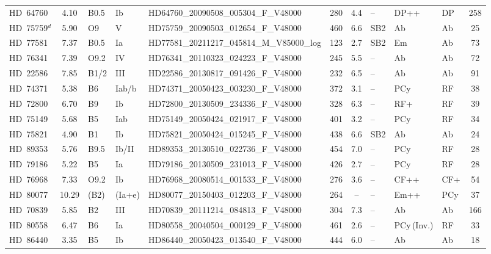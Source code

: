 {\begin{landscape}
\begin{longtable}{lclllcclllc}
\noalign{\smallskip}
HD~64760 & 4.10 & B0.5 & Ib & HD64760\_20090508\_005304\_F\_V48000 & 280 & 4.4 & -- & DP++ & DP & 258 \\
\noalign{\smallskip}
HD~75759$^{d}$ & 5.90 & O9 & V & HD75759\_20090503\_012654\_F\_V48000 & 460 & 6.6 & SB2 & Ab & Ab & 25 \\
\noalign{\smallskip}
HD~77581 & 7.37 & B0.5 & Ia & HD77581\_20211217\_045814\_M\_V85000\_log & 123 & 2.7 & SB2 & Em & Ab & 73 \\
\noalign{\smallskip}
HD~76341 & 7.39 & O9.2 & IV & HD76341\_20110323\_024223\_F\_V48000 & 245 & 5.5 & -- & Ab & Ab & 72 \\
\noalign{\smallskip}
HD~22586 & 7.85 & B1/2 & III & HD22586\_20130817\_091426\_F\_V48000 & 232 & 6.5 & -- & Ab & Ab & 91 \\
\noalign{\smallskip}
HD~74371 & 5.38 & B6 & Iab/b & HD74371\_20050423\_003230\_F\_V48000 & 372 & 3.1 & -- & PCy & RF & 38 \\
\noalign{\smallskip}
HD~72800 & 6.70 & B9 & Ib & HD72800\_20130509\_234336\_F\_V48000 & 328 & 6.3 & -- & RF+ & RF & 39 \\
\noalign{\smallskip}
HD~75149 & 5.68 & B5 & Iab & HD75149\_20050424\_021917\_F\_V48000 & 401 & 3.2 & -- & PCy & RF & 34 \\
\noalign{\smallskip}
HD~75821 & 4.90 & B1 & Ib & HD75821\_20050424\_015245\_F\_V48000 & 438 & 6.6 & SB2 & Ab & Ab & 24 \\
\noalign{\smallskip}
HD~89353 & 5.76 & B9.5 & Ib/II & HD89353\_20130510\_022736\_F\_V48000 & 454 & 7.0 & -- & PCy & RF & 28 \\
\noalign{\smallskip}
HD~79186 & 5.22 & B5 & Ia & HD79186\_20130509\_231013\_F\_V48000 & 426 & 2.7 & -- & PCy & RF & 28 \\
\noalign{\smallskip}
HD~76968 & 7.33 & O9.2 & Ib & HD76968\_20080514\_001533\_F\_V48000 & 276 & 3.6 & -- & CF++ & CF+ & 54 \\
\noalign{\smallskip}
HD~80077 & 10.29 & (B2) & (Ia+e) & HD80077\_20150403\_012203\_F\_V48000 & 264 & -- & -- & Em++ & PCy & 37 \\
\noalign{\smallskip}
HD~70839 & 5.85 & B2 & III & HD70839\_20111214\_084813\_F\_V48000 & 304 & 7.3 & -- & Ab & Ab & 166 \\
\noalign{\smallskip}
HD~80558 & 6.47 & B6 & Ia & HD80558\_20040504\_000129\_F\_V48000 & 461 & 2.6 & -- & PCy\,(Inv.) & RF & 33 \\
\noalign{\smallskip}
HD~86440 & 3.35 & B5 & Ib & HD86440\_20050423\_013540\_F\_V48000 & 444 & 6.0 & -- & Ab & Ab & 18 \\

\end{longtable}
\end{landscape}}
